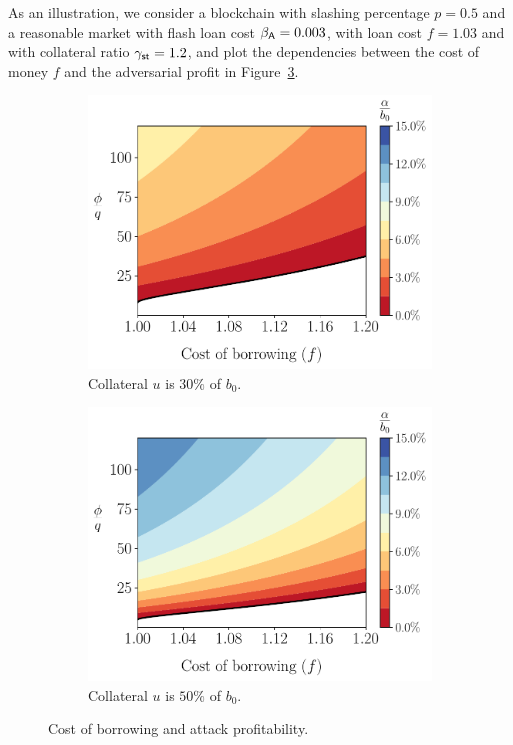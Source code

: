 As an illustration,
we consider a blockchain with slashing percentage
$p = 0.5$ and a reasonable market with \asset flash loan cost $\beta_{\textsf{A}} = 0.003$,
with \stasset loan cost $f = 1.03$ and with collateral ratio $\gamma_{\textsf{st}} = 1.2$,
and plot the dependencies between the cost of money $f$ and the adversarial
profit in Figure~\ref{fig:plotf}.


\begin{figure}[htb]
  \centering
  \begin{subfigure}{0.49\textwidth}
    \includegraphics[width=\textwidth]{./plots/plotf30.pdf}
    \caption{Collateral $u$ is $30\%$ of $b_0$.}
    \label{fig:plotf30}
  \end{subfigure}
  \hfill
  \begin{subfigure}{0.49\textwidth}
    \includegraphics[width=\textwidth]{./plots/plotf50.pdf}
    \caption{Collateral $u$ is $50\%$ of $b_0$.}
    \label{fig:plotf50}
  \end{subfigure}
  \caption{Cost of borrowing and attack profitability.}
  \label{fig:plotf}
\end{figure}


